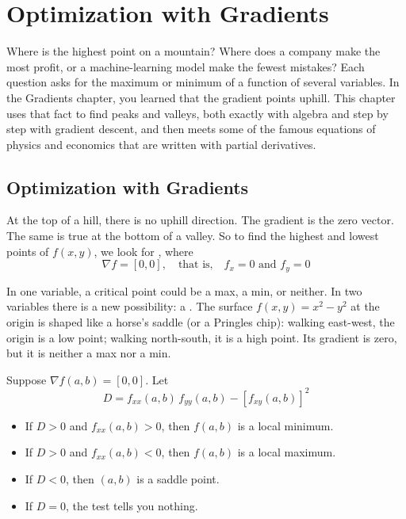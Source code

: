 \chapter{Optimization with Gradients}

Where is the highest point on a mountain? Where does a company make the most profit, or a machine-learning model
make the fewest mistakes? Each question asks for the maximum or minimum of a function of several variables. In
the Gradients chapter, you learned that the gradient points uphill. This chapter uses that fact to find peaks and
valleys, both exactly with algebra and step by step with gradient descent, and then meets some of the famous
equations of physics and economics that are written with partial derivatives.

\section{Optimization with Gradients}

At the top of a hill, there is no uphill direction. The gradient is the
zero vector. The same is true at the bottom of a valley. So to find the
highest and lowest points of $f(x, y)$, we look for , where
$$\nabla f = [0, 0], \quad\text{that is,}\quad f_x = 0 \text{ and } f_y = 0$$

In one variable, a critical point could be a max, a min, or neither. In two
variables there is a new possibility: a . The surface $f(x, y) = x^2 - y^2$ at the origin
is shaped like a horse's saddle (or a Pringles chip): walking east-west, the
origin is a low point; walking north-south, it is a high point. Its gradient
is zero, but it is neither a max nor a min.

\begin{mdframed}[style = important, frametitle = {The Second Derivative Test for Two Variables}]
Suppose $\nabla f(a, b) = [0, 0]$. Let
$$D = f_{xx}(a, b)\, f_{yy}(a, b) - \left[f_{xy}(a, b)\right]^2$$
\begin{itemize}
\item If $D > 0$ and $f_{xx}(a, b) > 0$, then $f(a, b)$ is a local minimum.
\item If $D > 0$ and $f_{xx}(a, b) < 0$, then $f(a, b)$ is a local maximum.
\item If $D < 0$, then $(a, b)$ is a saddle point.
\item If $D = 0$, the test tells you nothing.
\end{itemize}
\end{mdframed}

